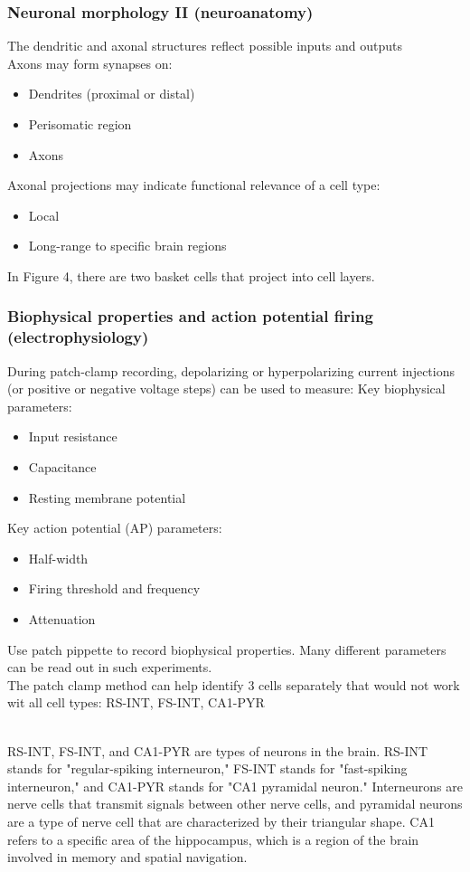 \begin{itemize}
\begin{itemize}
\subsubsection{Neuronal morphology II (neuroanatomy)}
The dendritic and axonal structures reflect possible inputs and outputs
\\Axons may form synapses on:
\begin{itemize}
    \item Dendrites (proximal or distal)
    \item Perisomatic region
    \item Axons
\end{itemize}
Axonal projections may indicate functional relevance of a cell type:
\begin{itemize}
    \item Local
    \item Long-range to specific brain regions
\end{itemize}

In Figure 4, there are two basket cells that project into cell layers. 

\subsubsection{Biophysical properties and action potential firing (electrophysiology)}
During patch-clamp recording, depolarizing or hyperpolarizing current injections (or positive or negative voltage steps) can be used to measure:
Key biophysical parameters:
\begin{itemize}
    \item  Input resistance
\item Capacitance
\item Resting membrane potential
\end{itemize}
Key action potential (AP) parameters:
\begin{itemize}
\item Half-width
\item Firing threshold and frequency
\item Attenuation
\end{itemize}
Use patch pippette to record biophysical properties. Many different parameters can be read out in such experiments.
\\The patch clamp method can help identify 3 cells separately that would not work wit all cell types: RS-INT, FS-INT, CA1-PYR

\\RS-INT, FS-INT, and CA1-PYR are types of neurons in the brain. RS-INT stands for "regular-spiking interneuron," FS-INT stands for "fast-spiking interneuron," and CA1-PYR stands for "CA1 pyramidal neuron." Interneurons are nerve cells that transmit signals between other nerve cells, and pyramidal neurons are a type of nerve cell that are characterized by their triangular shape. CA1 refers to a specific area of the hippocampus, which is a region of the brain involved in memory and spatial navigation.


\end{itemize}
\end{itemize}
